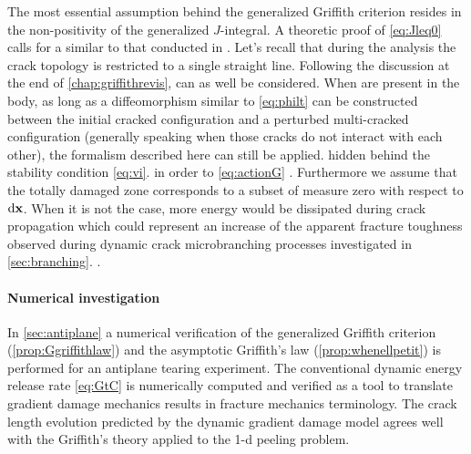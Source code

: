 The most essential assumption behind the generalized Griffith criterion resides in the non-positivity of the generalized $J$-integral. A theoretic proof of \cref{eq:Jleq0} calls for a  similar to that conducted in \cite{SicsicMarigo:2013}. Let's recall that during the analysis the crack topology is restricted to a single straight line. Following the discussion at the end of \cref{chap:griffithrevis},  can as well be considered. When  are present in the body, as long as a diffeomorphism similar to \eqref{eq:philt} can be constructed between the initial cracked configuration and a perturbed multi-cracked configuration (generally speaking when those cracks do not interact with each other), the formalism described here can still be applied.  hidden behind the stability condition \eqref{eq:vi}.  \cite{Hintermuller:2011} in order to  \eqref{eq:actionG} . Furthermore we assume that the totally damaged zone corresponds to a subset of measure zero with respect to $\md\vec{x}$. When it is not the case, more energy would be dissipated during crack propagation which could represent an increase of the apparent fracture toughness observed during dynamic crack microbranching processes investigated in \cref{sec:branching}. .

\paragraph{Numerical investigation} In \cref{sec:antiplane} a numerical verification of the generalized Griffith criterion (\cref{prop:Ggriffithlaw}) and the asymptotic Griffith's law (\cref{prop:whenellpetit}) is performed for an antiplane tearing experiment. The conventional dynamic energy release rate \eqref{eq:GtC} is numerically computed and verified as a tool to translate gradient damage mechanics results in fracture mechanics terminology. The crack length evolution predicted by the dynamic gradient damage model agrees well with the Griffith's theory applied to the 1-d peeling problem.


